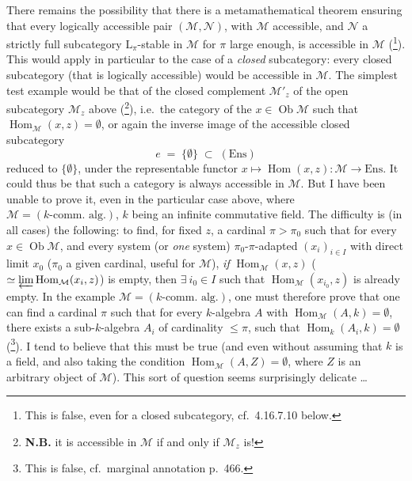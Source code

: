 \documentclass[11pt]{article}
\newcommand{\printedpage}[1]{\marginpar{\footnotesize p.~#1}}
\newcommand{\msp}[1]{\marginpar{\footnotesize [#1]}}
\newcommand{\Hom}{\operatorname{Hom}}
\newcommand{\Ob}{\operatorname{Ob}}
\newcommand{\Ens}{\mathrm{Ens}}
\begin{document}
There remains the possibility that there is a metamathematical theorem ensuring that every logically accessible pair $(\mathcal{M},\mathcal{N})$, with $\mathcal{M}$ accessible, and $\mathcal{N}$ a strictly full subcategory $\mathrm{L}_\pi$-stable in $\mathcal{M}$ for $\pi$ large enough, is accessible in $\mathcal{M}$ (\footnote[188]{This is false, even for a closed subcategory, cf.\ 4.16.7.10 below.}). This would apply in particular to the case of a \textit{closed} subcategory: every closed subcategory (that is logically accessible) would be accessible in $\mathcal{M}$. The simplest test example would be that of the closed complement $\mathcal{M}'_z$ of the open subcategory $\mathcal{M}_z$ above (\footnote[189]{\textbf{N.B.} it is accessible in $\mathcal{M}$ if and only if $\mathcal{M}_z$ is! %
}), i.e.\ the category of the $x \in \Ob\mathcal{M}$ such that $\Hom_{\mathcal{M}}(x,z) = \emptyset$, or again
\msp{467}
the inverse image of the accessible closed subcategory
\[
e \;=\; \{\emptyset\} \;\subset\; (\Ens)
\]
reduced to $\{\emptyset\}$, under the representable functor $x \longmapsto \Hom(x,z) : \mathcal{M} \longrightarrow \Ens$. It could thus be that such a category is always accessible in $\mathcal{M}$. But I have been unable to
\printedpage{181}
prove it, even in the particular case above, where $\mathcal{M} = (k\text{-comm.\ alg.})$, $k$ being an infinite commutative field. The difficulty is (in all cases) the following: to find, for fixed $z$, a cardinal $\pi > \pi_0$ such that for every $x \in \Ob\mathcal{M}$, and every system (or \textit{one} system) $\pi_0$-$\pi$-adapted $(x_i)_{i\in I}$ with direct limit $x_0$ ($\pi_0$ a given cardinal, useful for $\mathcal{M}$), \textit{if} $\Hom_{\mathcal{M}}(x,z)$ ($\simeq \varprojlim \Hom_{\mathcal{M}}(x_i,z)$) is empty, then $\exists\ i_0 \in I$ such that $\Hom_{\mathcal{M}}(x_{i_0},z)$ is already empty. In the example $\mathcal{M} = (k\text{-comm.\ alg.})$, one must therefore prove that one can find a cardinal $\pi$
such that for every $k$-algebra $A$ with $\Hom_{\mathcal{M}}(A,k) = \emptyset$, there exists a sub-$k$-algebra $A_i$ of %
cardinality $\leqslant \pi$, such that $\Hom_k(A_i,k) = \emptyset$ (\footnote[190]{This is false, cf.\ marginal annotation p.~466.}). I tend to believe that this must be true (and even without
\msp{468}
assuming that $k$ is a field, and also taking the condition $\Hom_{\mathcal{M}}(A,Z) = \emptyset$, where $Z$ is an arbitrary object of $\mathcal{M}$). This sort of question seems surprisingly delicate \dots %
\end{document}

